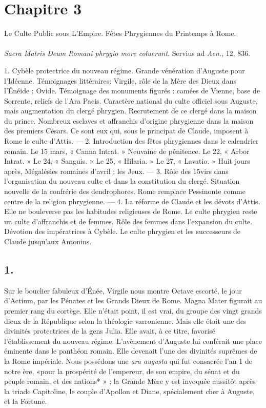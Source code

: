 \documentclass[a4paper, 11pt, oneside, polutonikogreek, french]{article}
\begin{document}
\section{Chapitre 3}
\begin{center}
Le Culte Public sous L'Empire. Fêtes Phrygiennes du Printemps à Rome.
\end{center}
\paragraph{}
\emph{Sacra Matris Deum Romani phrygio more coluerunt}. Servius ad \emph{Aen.}, 12, 836.

1. Cybèle protectrice du nouveau régime. Grande vénération d'Auguste pour l'Idéenne. Témoignages littéraires: Virgile, rôle de la Mère des Dieux dans l'Énéide ; Ovide. Témoignage des monuments figurés : camées de Vienne, base de Sorrente, reliefs de l'Ara Pacis. Caractère national du culte officiel sous Auguste, mais augmentation du clergé phrygien. Recrutement de ce clergé dans la maison du prince. Nombreux esclaves et affranchis d'origine phrygienne dans la maison des premiers Césars. Ce sont eux qui, sous le principat de Claude, imposent à Rome le culte d'Attis. --- 2. Introduction des fêtes phrygiennes dans le calendrier romain. Le 15 mars, « Canna Intrat. » Neuvaine de pénitence. Le 22, « Arbor Intrat. » Le 24, « Sanguis. » Le 25, « Hilaria. » Le 27, « Lavatio. » Huit jours après, Mégalésies romaines d'avril ; les Jeux. --- 3. Rôle des 15virs dans l'organisation du nouveau culte et dans la constitution du clergé. Situation nouvelle de la confrérie des dendrophores. Rome remplace Pessinonte comme centre de la religion phrygienne. --- 4. La réforme de Claude et les dévots d'Attis. Elle ne bouleverse pas les habitudes religieuses de Rome. Le culte phrygien reste un culte d'affranchis et de femmes. Rôle des femmes dans l'expansion du culte. Dévotion des impératrices à Cybèle. Le culte phrygien et les successeurs de Claude jusqu'aux Antonins.

\subsection{1.}

Sur le bouclier fabuleux d'Énée, Virgile nous montre Octave escorté, le jour d'Actium, par les Pénates et les Grands Dieux de Rome. Magna Mater figurait au premier rang du cortège. Elle n'était point, il est vrai, du groupe des vingt grands dieux de la République selon la théologie varronienne. Mais elle était une des divinités protectrices de la gens Julia. Elle avait, à ce titre, favorisé l'établissement du nouveau régime. L'avènement d'Auguste lui conférait une place éminente dans le panthéon romain. Elle devenait l'une des divinités suprêmes de la Rome impériale. Nous possédons une \emph{ara augusta} qui fut consacrée l'an 1 de notre ère, «pour la prospérité de l'empereur, de son empire, du sénat et du peuple romain, et des nations* » ; la Grande Mère y est invoquée aussitôt après la triade Capitoline, le couple d'Apollon et Diane, spécialement cher à Auguste, et la Fortune.
\end{document}
